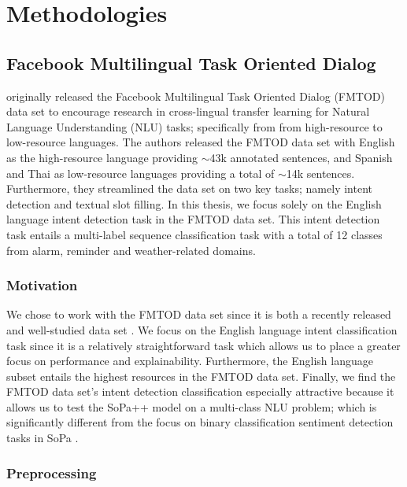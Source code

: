 \chapter{Methodologies}

\label{chapter:methodologies}

\section{Facebook Multilingual Task Oriented Dialog}

\citet{schuster-etal-2019-cross-lingual} originally released the Facebook Multilingual Task Oriented Dialog (FMTOD) data set to encourage research in cross-lingual transfer learning for Natural Language Understanding (NLU) tasks; specifically from from high-resource to low-resource languages. The authors released the FMTOD data set with English as the high-resource language providing $\sim$43k annotated sentences, and Spanish and Thai as low-resource languages providing a total of $\sim$14k sentences. Furthermore, they streamlined the data set on two key tasks; namely intent detection and textual slot filling. In this thesis, we focus solely on the English language intent detection task in the FMTOD data set. This intent detection task entails a multi-label sequence classification task with a total of 12 classes from alarm, reminder and weather-related domains.

\subsection{Motivation}

We chose to work with the FMTOD data set since it is both a recently released and well-studied data set \citep{schuster-etal-2019-cross-lingual,zhang2019joint,zhang-etal-2020-intent}. We focus on the English language intent classification task since it is a relatively straightforward task which allows us to place a greater focus on performance and explainability. Furthermore, the English language subset entails the highest resources in the FMTOD data set. Finally, we find the FMTOD data set's intent detection classification especially attractive because it allows us to test the SoPa++ model on a multi-class NLU problem; which is significantly different from the focus on binary classification sentiment detection tasks in SoPa \citep{schwartz2018sopa}.

\subsection{Preprocessing}

